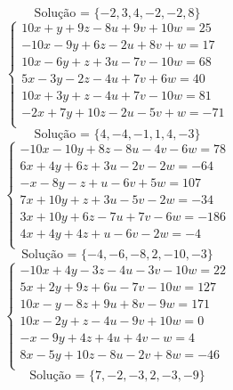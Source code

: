\documentclass[12pt,oneside,a4paper]{article}
\begin{document}
\begin{equation*}
\text{Solução = }\{-2,3,4,-2,-2,8\}
\end{equation*}
\vspace{\baselineskip}
\begin{equation*}
\begin{cases}
10x+y+9z-8u+9v+10w=25 \\
-10x-9y+6z-2u+8v+w=17 \\
10x-6y+z+3u-7v-10w=68 \\
5x-3y-2z-4u+7v+6w=40 \\
10x+3y+z-4u+7v-10w=81 \\
-2x+7y+10z-2u-5v+w=-71 \\
\end{cases}
\end{equation*}
\begin{equation*}
\text{Solução = }\{4,-4,-1,1,4,-3\}
\end{equation*}
\vspace{\baselineskip}
\begin{equation*}
\begin{cases}
-10x-10y+8z-8u-4v-6w=78 \\
6x+4y+6z+3u-2v-2w=-64 \\
-x-8y-z+u-6v+5w=107 \\
7x+10y+z+3u-5v-2w=-34 \\
3x+10y+6z-7u+7v-6w=-186 \\
4x+4y+4z+u-6v-2w=-4 \\
\end{cases}
\end{equation*}
\begin{equation*}
\text{Solução = }\{-4,-6,-8,2,-10,-3\}
\end{equation*}
\vspace{\baselineskip}
\begin{equation*}
\begin{cases}
-10x+4y-3z-4u-3v-10w=22 \\
5x+2y+9z+6u-7v-10w=127 \\
10x-y-8z+9u+8v-9w=171 \\
10x-2y+z-4u-9v+10w=0 \\
-x-9y+4z+4u+4v-w=4 \\
8x-5y+10z-8u-2v+8w=-46 \\
\end{cases}
\end{equation*}
\begin{equation*}
\text{Solução = }\{7,-2,-3,2,-3,-9\}
\end{equation*}
\end{document}
